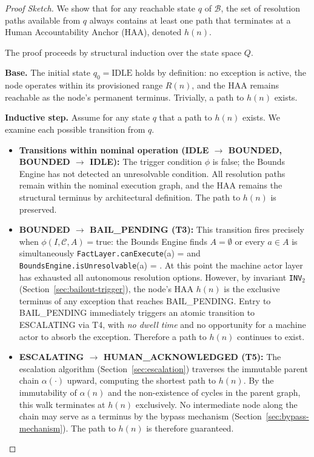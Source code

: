 \begin{proof}[Proof Sketch]
We show that for any reachable state $q$ of $\mathcal{B}$, the set of resolution paths available from $q$ always contains at least one path that terminates at a Human Accountability Anchor (HAA), denoted $h(n)$.

The proof proceeds by structural induction over the state space $Q$.

\medskip\noindent\textbf{Base.} The initial state $q_0 = \text{IDLE}$ holds by definition: no exception is active, the node operates within its provisioned range $R(n)$, and the HAA remains reachable as the node's permanent terminus. Trivially, a path to $h(n)$ exists.

\medskip\noindent\textbf{Inductive step.} Assume for any state $q$ that a path to $h(n)$ exists. We examine each possible transition from $q$.

\begin{itemize}
  \item \textbf{Transitions within nominal operation (IDLE $\rightarrow$ BOUNDED, BOUNDED $\rightarrow$ IDLE):} The trigger condition $\phi$ is false; the Bounds Engine has not detected an unresolvable condition. All resolution paths remain within the nominal execution graph, and the HAA remains the structural terminus by architectural definition. The path to $h(n)$ is preserved.

  \item \textbf{BOUNDED $\rightarrow$ BAIL\_PENDING (T3):} This transition fires precisely when $\phi(I, \mathcal{C}, A) = \text{true}$: the Bounds Engine finds $A = \emptyset$ or every $a \in A$ is simultaneously \texttt{FactLayer.canExecute}(a) =  and \texttt{BoundsEngine.isUnresolvable}(a) = . At this point the machine actor layer has exhausted all autonomous resolution options. However, by invariant \texttt{INV}$_2$ (Section~\ref{sec:bailout-trigger}), the node's HAA $h(n)$ is the exclusive terminus of any exception that reaches BAIL\_PENDING. Entry to BAIL\_PENDING immediately triggers an atomic transition to ESCALATING via T4, with \emph{no dwell time} and no opportunity for a machine actor to absorb the exception. Therefore a path to $h(n)$ continues to exist.

  \item \textbf{ESCALATING $\rightarrow$ HUMAN\_ACKNOWLEDGED (T5):} The escalation algorithm (Section~\ref{sec:escalation}) traverses the immutable parent chain $\alpha(\cdot)$ upward, computing the shortest path to $h(n)$. By the immutability of $\alpha(n)$ and the non-existence of cycles in the parent graph, this walk terminates at $h(n)$ exclusively. No intermediate node along the chain may serve as a terminus by the bypass mechanism (Section~\ref{sec:bypass-mechanism}). The path to $h(n)$ is therefore guaranteed.


\end{itemize}
\end{proof}
